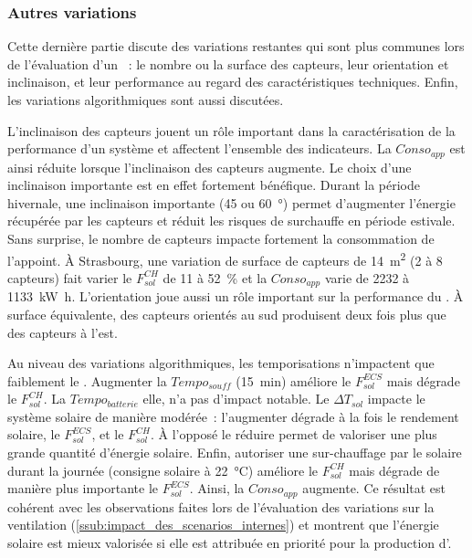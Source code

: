 \subsubsection{Autres variations} %
\label{ssub:autres_variations}
Cette dernière partie discute des variations restantes qui sont plus communes lors
de l’évaluation d’un ~: le nombre ou la surface des capteurs, leur
orientation et inclinaison, et leur performance au regard des caractéristiques techniques.
Enfin, les variations algorithmiques sont aussi discutées.

L’inclinaison des capteurs jouent un rôle important dans la caractérisation de la
performance d’un système  et affectent l’ensemble des indicateurs. La $Conso_{app}$
est ainsi réduite lorsque l’inclinaison des capteurs augmente. Le choix d’une inclinaison
importante est en effet fortement bénéfique. Durant la période hivernale, une inclinaison
importante (\num{45} ou \SI{60}{\degree}) permet d’augmenter l’énergie récupérée par les
capteurs et réduit les risques de surchauffe en période estivale. Sans surprise, le
nombre de capteurs impacte fortement la consommation de l’appoint. À Strasbourg, une
variation de surface de capteurs de \SI{14}{\meter\squared} (\num{2} à \num{8} capteurs)
fait varier le $F_{sol}^{CH}$ de \num{11} à \SI{52}{\percent} et la $Conso_{app}$ varie de
\num{2232} à \SI{1133}{\kilo\watt\hour}. L’orientation joue aussi un rôle important sur la
performance du . À surface équivalente, des capteurs orientés au sud produisent deux
fois plus que des capteurs à l’est.

Au niveau des variations algorithmiques, les temporisations n’impactent que faiblement
le . Augmenter la $Tempo_{souff}$ (\SI{15}{min}) améliore le $F_{sol}^{ECS}$ mais dégrade
le $F_{sol}^{CH}$. La $Tempo_{batterie}$ elle, n’a pas d’impact notable. Le $\Delta T_{sol}$
impacte le système solaire de manière modérée~: l’augmenter dégrade à la fois le rendement
solaire, le $F_{sol}^{ECS}$, et le $F_{sol}^{CH}$. À l’opposé le réduire permet de valoriser une plus
grande quantité d’énergie solaire. Enfin, autoriser une sur-chauffage par le solaire
durant la journée (consigne solaire à \SI{22}{\celsius}) améliore le $F_{sol}^{CH}$ mais dégrade
de manière plus importante le $F_{sol}^{ECS}$. Ainsi, la $Conso_{app}$ augmente. Ce résultat est
cohérent avec les observations faites lors de l’évaluation des variations sur la
ventilation (\ref{ssub:impact_des_scenarios_internes}) et montrent que l’énergie solaire
est mieux valorisée si elle est attribuée en priorité pour la production d’.

